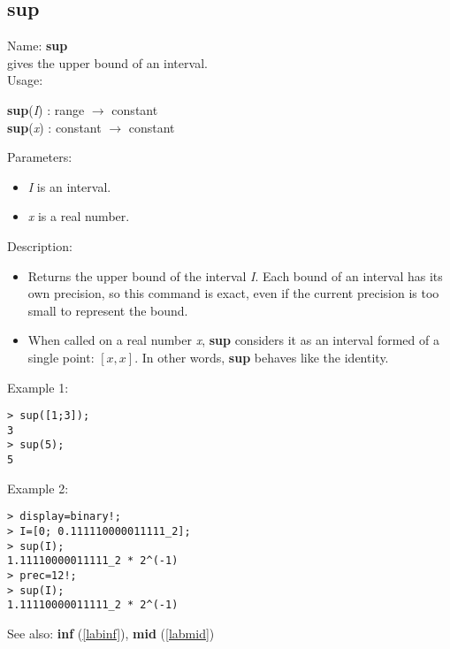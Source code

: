 \subsection{sup}
\label{labsup}
\noindent Name: \textbf{sup}\\
gives the upper bound of an interval.\\
\noindent Usage: 
\begin{center}
\textbf{sup}(\emph{I}) : \textsf{range} $\rightarrow$ \textsf{constant}\\
\textbf{sup}(\emph{x}) : \textsf{constant} $\rightarrow$ \textsf{constant}\\
\end{center}
Parameters: 
\begin{itemize}
\item \emph{I} is an interval.
\item \emph{x} is a real number.
\end{itemize}
\noindent Description: \begin{itemize}

\item Returns the upper bound of the interval \emph{I}. Each bound of an interval has its 
   own precision, so this command is exact, even if the current precision is too 
   small to represent the bound.

\item When called on a real number \emph{x}, \textbf{sup} considers it as an interval formed
   of a single point: $\left[ x, x \right]$. In other words, \textbf{sup} behaves like the identity.
\end{itemize}
\noindent Example 1: 
\begin{center}\begin{minipage}{15cm}\begin{Verbatim}[frame=single]
> sup([1;3]);
3
> sup(5);
5
\end{Verbatim}
\end{minipage}\end{center}
\noindent Example 2: 
\begin{center}\begin{minipage}{15cm}\begin{Verbatim}[frame=single]
> display=binary!;
> I=[0; 0.111110000011111_2];
> sup(I);
1.11110000011111_2 * 2^(-1)
> prec=12!;
> sup(I);
1.11110000011111_2 * 2^(-1)
\end{Verbatim}
\end{minipage}\end{center}
See also: \textbf{inf} (\ref{labinf}), \textbf{mid} (\ref{labmid})
